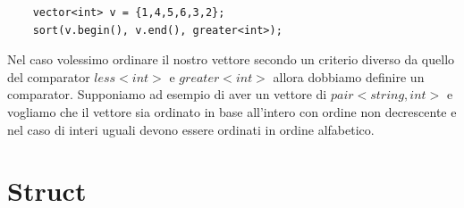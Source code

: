 \documentclass{article}
\begin{document}
\begin{lstlisting}
    vector<int> v = {1,4,5,6,3,2};
    sort(v.begin(), v.end(), greater<int>);
\end{lstlisting}

Nel caso volessimo ordinare il nostro vettore secondo un criterio diverso da quello del comparator $less<int>$ e $greater<int>$ allora dobbiamo definire un comparator. Supponiamo ad esempio di aver un vettore di $pair<string, int>$ e vogliamo che il vettore sia ordinato in base all'intero con ordine non decrescente e nel caso di interi uguali devono essere ordinati in ordine alfabetico.

\section{Struct}
\end{document}
